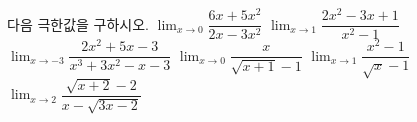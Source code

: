 다음 극한값을 구하시오.
 $\displaystyle\lim_{x\to 0}\dfrac{6x+5x^2}{2x-3x^2}$
 $\displaystyle\lim_{x\to 1}\dfrac{2x^2-3x+1}{x^2-1}$
 $\displaystyle\lim_{x\to -3}\dfrac{2x^2+5x-3}{x^3+3x^2-x-3}$
 $\displaystyle\lim_{x\to 0}\dfrac{x}{\sqrt{x+1}-1}$
 $\displaystyle\lim_{x\to 1}\dfrac{x^2-1}{\sqrt{x}-1}$
 $\displaystyle\lim_{x\to 2}\dfrac{\sqrt{x+2}-2}{x-\sqrt{3x-2}}$
